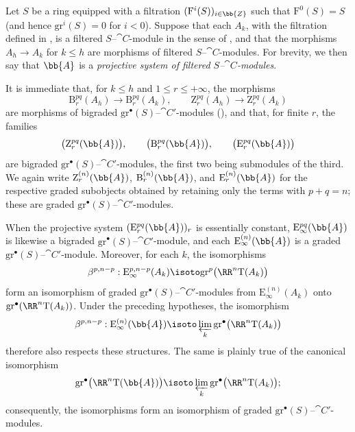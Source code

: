 \begin{env}[13.7.6]
\label{0.13.7.6}
Let $S$ be a ring equipped with a filtration
$(\mathrm{F}^i(S))_{i\in\bb{Z}}$ such that
$\mathrm{F}^0(S)=S$ (and hence
$\mathrm{gr}^i(S)=0$ for $i<0$).
Suppose that each $A_k$, with the filtration defined in
, is a filtered
$S$--$\cat{C}$-module in the sense of , and that the
morphisms $A_h\longrightarrow A_k$ for $k\leq h$ are morphisms of
filtered $S$--$\cat{C}$-modules.
For brevity, we then say that $\bb{A}$ is a
\emph{projective system of filtered $S$--$\cat{C}$-modules}.

It is immediate that, for $k\leq h$ and
$1\leq r\leq+\infty$, the morphisms
\[
  \mathrm{B}_r^{pq}(A_h)\longrightarrow\mathrm{B}_r^{pq}(A_k),
  \qquad
  \mathrm{Z}_r^{pq}(A_h)\longrightarrow\mathrm{Z}_r^{pq}(A_k)
\]
are morphisms of bigraded
$\mathrm{gr}^\bullet(S)$--$\cat{C}'$-modules
(), and that, for finite $r$, the families
\[
  \bigl(\mathrm{Z}_r^{pq}(\bb{A})\bigr),\qquad
  \bigl(\mathrm{B}_r^{pq}(\bb{A})\bigr),\qquad
  \bigl(\mathrm{E}_r^{pq}(\bb{A})\bigr)
\]
are bigraded
$\mathrm{gr}^\bullet(S)$--$\cat{C}'$-modules, the first two being
submodules of the third.
We again write
$\mathrm{Z}_r^{(n)}(\bb{A})$,
$\mathrm{B}_r^{(n)}(\bb{A})$, and
$\mathrm{E}_r^{(n)}(\bb{A})$ for the respective graded subobjects
obtained by retaining only the terms with $p+q=n$; these are graded
$\mathrm{gr}^\bullet(S)$--$\cat{C}'$-modules.

When the projective system
$(\mathrm{E}_r^{pq}(\bb{A}))_r$ is essentially constant,
$\mathrm{E}_\infty^{pq}(\bb{A})$ is likewise a bigraded
$\mathrm{gr}^\bullet(S)$--$\cat{C}'$-module, and each
$\mathrm{E}_\infty^{(n)}(\bb{A})$ is a graded
$\mathrm{gr}^\bullet(S)$--$\cat{C}'$-module.
Moreover, for each $k$, the isomorphisms
\[
  \beta^{p,n-p}:
  \mathrm{E}_\infty^{p,n-p}(A_k)
  \isoto
  \mathrm{gr}^p\bigl(\RR^n\mathrm{T}(A_k)\bigr)
\]
form an isomorphism of graded
$\mathrm{gr}^\bullet(S)$--$\cat{C}'$-modules from
$\mathrm{E}_\infty^{(n)}(A_k)$ onto
$\mathrm{gr}^\bullet(\RR^n\mathrm{T}(A_k))$.
Under the preceding hypotheses, the isomorphism
\[
  \beta^{p,n-p}:
  \mathrm{E}_\infty^{(n)}(\bb{A})
  \isoto
  \varprojlim_k
  \mathrm{gr}^\bullet\bigl(\RR^n\mathrm{T}(A_k)\bigr)
\]
therefore also respects these structures.
The same is plainly true of the canonical isomorphism
\[
  \mathrm{gr}^\bullet\bigl(\RR^n\mathrm{T}(\bb{A})\bigr)
  \isoto
  \varprojlim_k
  \mathrm{gr}^\bullet\bigl(\RR^n\mathrm{T}(A_k)\bigr);
\]
consequently, the isomorphisms  form an
isomorphism of graded
$\mathrm{gr}^\bullet(S)$--$\cat{C}'$-modules.
\end{env}

